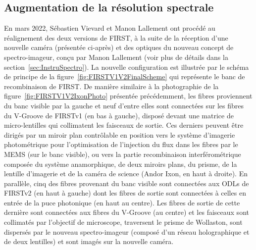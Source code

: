 \subsection{Augmentation de la résolution spectrale}
\label{sec:V1V2Subaru}

En mars 2022, Sébastien Vievard et Manon Lallement ont procédé au réalignement des deux versions de \ac{FIRST}, à la suite de la réception d'une nouvelle caméra (présentée ci-après) et des optiques du nouveau concept de spectro-imageur, conçu par Manon Lallement (voir plus de détails dans la section~\ref{sec:InstruSpectro}). La nouvelle configuration est illustrée par le schéma de principe de la figure~\ref{fig:FIRSTV1V2FinalScheme} qui représente le banc de recombinaison de \ac{FIRST}. De manière similaire à la photographie de la figure~\ref{fig:FIRSTV1V2IxonPhoto} présentée précédemment, les fibres proviennent du banc visible par la gauche et neuf d'entre elles sont connectées sur les fibres du V-Groove de \ac{FIRSTv1} (en bas à gauche), disposé devant une matrice de micro-lentilles qui collimatent les faisceaux de sortie. Ces derniers peuvent être dirigés par un miroir plan contrôlable en position vers le système d'imagerie photométrique pour l'optimisation de l'injection du flux dans les fibres par le \ac{MEMS} (sur le banc visible), ou vers la partie recombinaison interférométrique composée du système anamorphique, de deux miroirs plans, du prisme, de la lentille d'imagerie et de la caméra de science (Andor Ixon, en haut à droite). En parallèle, cinq des fibres provenant du banc visible sont connectées aux \ac{ODL}s de \ac{FIRSTv2} (en haut à gauche) dont les fibres de sortie sont connectées à celles en entrée de la puce photonique (en haut au centre). Les fibres de sortie de cette dernière sont connectées aux fibres du V-Groove (au centre) et les faisceaux sont collimatés par l'objectif de microscope, traversent le prisme de Wollaston, sont dispersés par le nouveau spectro-imageur (composé d'un réseau holographique et de deux lentilles) et sont imagés sur la nouvelle caméra.

